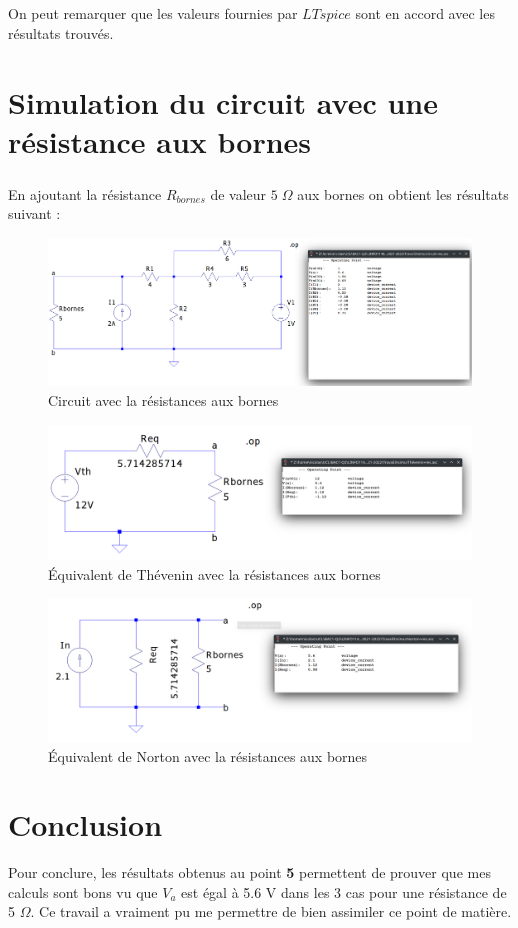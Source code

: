     \subparagraph{}On peut remarquer que les valeurs fournies par $LTspice$ sont en accord avec les résultats trouvés.

\section{Simulation du circuit avec une résistance aux bornes}

    \subparagraph{}En ajoutant la résistance $R_{bornes}$ de valeur $5\;\Omega$ aux bornes on obtient les résultats suivant :
    
        \begin{figure}[H]
            \centering
            \includegraphics[width=\textwidth]{../pictures/c+r.png}
            \caption{Circuit avec la résistances aux bornes}
        \end{figure}
    
        \begin{figure}[H]
            \centering
            \includegraphics[width=\textwidth]{../pictures/t+r.png}
            \caption{Équivalent de Thévenin avec la résistances aux bornes}
        \end{figure}
    
        \begin{figure}[H]
            \centering
            \includegraphics[width=\textwidth]{../pictures/n+r.png}
            \caption{Équivalent de Norton avec la résistances aux bornes}
        \end{figure}

\section{Conclusion}

    Pour conclure, les résultats obtenus au point \textbf{5} permettent de prouver que mes calculs sont bons vu que $V_a$ est égal à 5.6 V dans les 3 cas pour une résistance de 5 $\Omega$. Ce travail a vraiment pu me permettre de bien assimiler ce point de matière.

